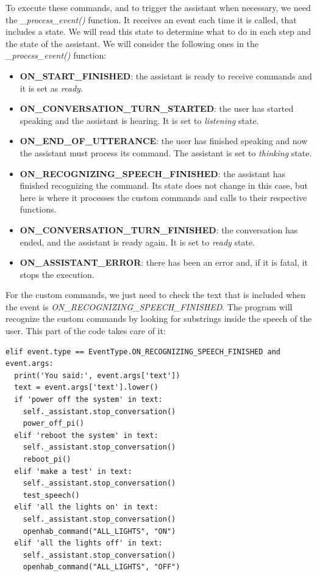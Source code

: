 To execute these commands, and to trigger the assistant when necessary, we need the \textit{\_process\_event()} function. It receives
an event each time it is called, that includes a state. We will read this state to determine what to do in each step and the state
of the assistant. We will consider the following ones in the\textit{ \_process\_event()} function:

\begin{itemize}
	\item \textbf{ON\_START\_FINISHED}: the assistant is ready to receive commands and it is set as \textit{ready}.
    \item \textbf{ON\_CONVERSATION\_TURN\_STARTED}: the user has started speaking and the assistant is hearing. It is set to
    \textit{listening} state.
    \item \textbf{ON\_END\_OF\_UTTERANCE}: the user has finished speaking and now the assistant must process its command. The assistant
    is set to \textit{thinking} state.
    \item \textbf{ON\_RECOGNIZING\_SPEECH\_FINISHED}: the assistant has finished recognizing the command. Its state does not change
    in this case, but here is where it processes the custom commands and calls to their respective functions.
    \item \textbf{ON\_CONVERSATION\_TURN\_FINISHED}: the conversation has ended, and the assistant is ready again. It is set to
    \textit{ready} state.
    \item \textbf{ON\_ASSISTANT\_ERROR}: there has been an error and, if it is fatal, it stops the execution.
\end{itemize}

For the custom commands, we just need to check the text that is included when the event is \textit{ON\_RECOGNIZING\_SPEECH\_FINISHED}.
The program will recognize the custom commands by looking for substrings inside the speech of the user. This part of the code
takes care of it:

\begin{lstlisting}[style=PythonCode]
elif event.type == EventType.ON_RECOGNIZING_SPEECH_FINISHED and event.args:
  print('You said:', event.args['text'])
  text = event.args['text'].lower()
  if 'power off the system' in text:
    self._assistant.stop_conversation()
    power_off_pi()
  elif 'reboot the system' in text:
    self._assistant.stop_conversation()
    reboot_pi()
  elif 'make a test' in text:
    self._assistant.stop_conversation()
    test_speech()
  elif 'all the lights on' in text:
    self._assistant.stop_conversation()
    openhab_command("ALL_LIGHTS", "ON")
  elif 'all the lights off' in text:
    self._assistant.stop_conversation()
    openhab_command("ALL_LIGHTS", "OFF")
\end{lstlisting}


